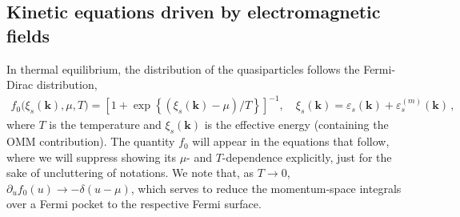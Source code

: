 \documentclass[aps,prb,onecolumn,nofootinbib,citeautoscript,10pt, showkeys]{revtex4-2}
\begin{document}
\subsection{Kinetic equations driven by electromagnetic fields}

In thermal equilibrium, the distribution of the quasiparticles follows the Fermi-Dirac distribution,
\begin{align}
\label{eqdist}
f_0 \big (\xi_s (\boldsymbol k) , \mu, T \big )
= \left[ 1 + \exp \left \lbrace  
\left(  \xi_s (\boldsymbol k)-\mu \right) /T  \right \rbrace \right ]^{-1}, 
\quad \xi_s ({ \boldsymbol k}) = {\varepsilon}_s  ({ \boldsymbol k})  
+ \varepsilon_s^{(m)}   (\boldsymbol k) \,,
\end{align}
where $T $ is the temperature and
$ \xi_s ({ \boldsymbol k}) $ is the effective energy (containing the OMM contribution).
The quantity $f_0$ will appear in the equations that follow, where we will suppress showing its $\mu$- and $ T $-dependence explicitly, just for the sake of uncluttering of notations. We note that, as $T \rightarrow 0$, $\partial_u f_0 (u) \rightarrow - \delta (u -\mu ) $, which serves to reduce the momentum-space integrals over a Fermi pocket to the respective Fermi surface.
\end{document}
